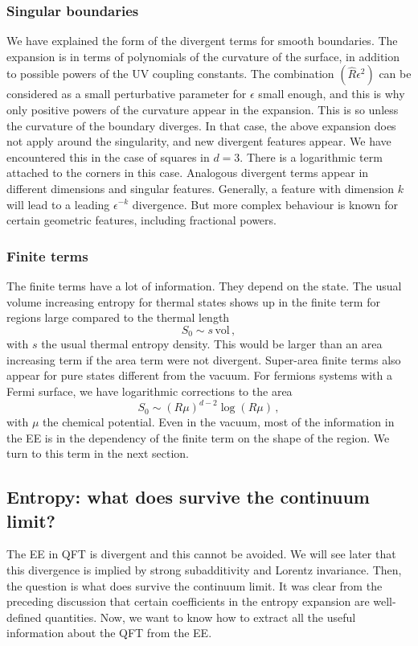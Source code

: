 \documentclass[11pt]{article}
\numberwithin{equation}{section}
\newcommand{\be}{\begin{equation}}
\newcommand{\ee}{\end{equation}}
\begin{document}
\subsubsection*{Singular boundaries}
We have explained the form of the divergent terms for smooth boundaries. 
The expansion is in terms of polynomials of the curvature of the surface, in addition to possible powers of the UV coupling constants. 
 The combination $(\hat{R}\epsilon^2)$ can be considered as a small perturbative parameter for $\epsilon$ small enough, and this is why only positive powers of the curvature appear in the expansion.  This is so unless the curvature of the boundary diverges. In that case, the above expansion does not apply around the singularity, and new divergent features appear.
 We have encountered this in the case of squares in $d=3$. There is a logarithmic term attached to the corners in this case. Analogous divergent terms appear in different dimensions and singular features. Generally, a feature with dimension $k$ will lead to a leading $\epsilon^{-k}$ divergence. But more complex behaviour is known for certain geometric features, including fractional powers.  

\subsubsection*{Finite terms}

The finite terms have a lot of information. They depend on the state. The usual volume increasing entropy for thermal states shows up in the finite term for regions large compared to the thermal length
\be
S_0\sim s\,\textrm{vol}\,,  
\ee
with $s$ the usual thermal entropy density. This would be larger than an area increasing term if the area term were not divergent. Super-area finite terms also appear for pure states different from the vacuum. For fermions systems with a Fermi surface, we have logarithmic corrections to the area 
\be
S_0\sim (R\mu)^{d-2} \log(R \mu)\,,  
\ee
with $\mu$ the chemical potential. Even in the vacuum, most of the information in the EE is in the dependency of the finite term on the shape of the region.   
We turn to this term in the next section. 

\subsection{Entropy: what does survive the continuum limit?}
\label{regent}


The EE in QFT is divergent and this cannot be avoided. We will see later that this divergence is implied by strong subadditivity and Lorentz invariance. Then, the question is what does survive the continuum limit. It was clear from the preceding discussion that certain coefficients in the entropy expansion are well-defined quantities. Now, we want to know how to extract all the useful information about the QFT from the EE.
  
\end{document}

